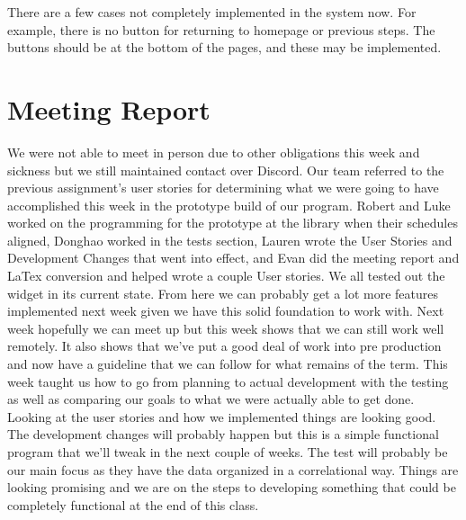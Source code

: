\documentclass[12pt, letterpaper]{article}
\begin{document}
There are a few cases not completely implemented in the system now. For example, there is no button for returning to homepage or previous steps. The buttons should be at the bottom of the pages, and these may be implemented.



\section{Meeting Report}
We were not able to meet in person due to other obligations this week and sickness but we still maintained contact over Discord. Our team referred to the previous assignment’s user stories for determining what we were going to have accomplished this week in the prototype build of our program. Robert and Luke worked on the programming for the prototype at the library when their schedules aligned, Donghao worked in the tests section, Lauren wrote the User Stories and Development Changes that went into effect, and Evan did the meeting report and LaTex conversion and helped wrote a couple User stories. We all tested out the widget in its current state. From here we can probably get a lot more features implemented next week given we have this solid foundation to work with. 
Next week hopefully we can meet up but this week shows that we can still work well remotely. It also shows that we’ve put a good deal of work into pre production and now have a guideline that we can follow for what remains of the term. This week taught us how to go from planning to actual development with the testing as well as comparing our goals to what we were actually able to get done. Looking at the user stories and how we implemented things are looking good. The development changes will probably happen but this is a simple functional program that we’ll tweak in the next couple of weeks. The test will probably be our main focus as they have the data organized in a correlational way. Things are looking promising and we are on the steps to developing something that could be completely functional at the end of this class. 
\end{document}
